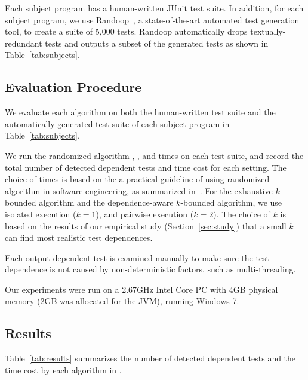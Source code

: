 Each subject program has a human-written JUnit test suite.
In addition, for each subject program, we use
Randoop~\cite{PachecoLET2007}, a state-of-the-art automated
test generation tool, to create a suite of 5,000 tests.
Randoop automatically drops textually-redundant tests 
and outputs a subset of the generated tests as
shown in Table~\ref{tab:subjects}.


\subsection{Evaluation Procedure}

We evaluate each algorithm 
on both the human-written test suite 
and the automatically-generated test suite
of each subject program in Table~\ref{tab:subjects}.


We run the randomized algorithm \smalltrialnum, \mediumtrialnum,
and \trialnum times on each test suite, and record
the total number of detected dependent tests and time cost
for each setting. The choice of \trialnum times is based
on the a practical guideline of using randomized algorithm
in software engineering, as summarized in~\cite{Arcuri:2011}.
%
For the exhaustive $k$-bounded algorithm
and the dependence-aware $k$-bounded algorithm,
we use isolated execution ($k = 1$), and
pairwise execution ($k = 2$). The choice of $k$ is
based on the results of our empirical
study (Section~\ref{sec:study}) that a small $k$
can find most realistic test dependences.


Each output dependent test is examined manually to make
sure the test dependence is not caused by non-deterministic
factors, such as multi-threading.

Our experiments were run on a 2.67GHz Intel Core PC
with 4GB physical memory (2GB was allocated for the JVM),
running Windows 7.

\subsection{Results}

Table~\ref{tab:results} summarizes the number of detected
dependent tests and the time cost by each algorithm
in \ourtool.


